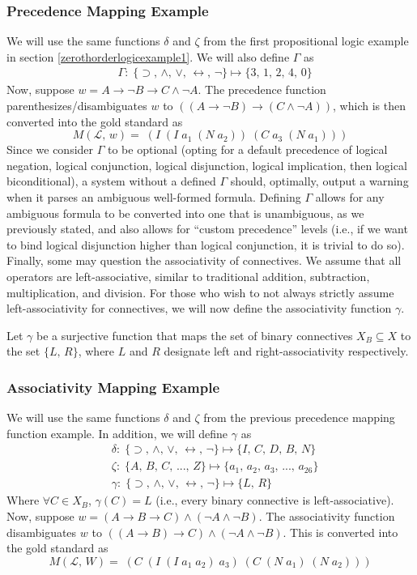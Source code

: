 \documentclass[ms]{uncgdissertationexp2}
\theoremstyle{plain}
\theoremstyle{definition}
\theoremstyle{remark}
\begin{document}
\subsubsection{Precedence Mapping Example} We will use the same functions $\delta$ and $\zeta$ from the first propositional logic example in section \ref{zerothorderlogicexample1}. We will also define $\Gamma$ as
\begin{align*}
	& \Gamma:\;\{\supset,\,\land,\,\lor,\,\leftrightarrow,\,\lnot\}\mapsto\{3,\,1,\,2,\,4,\,0\}                              
\end{align*}
Now, suppose $w = A \to \lnot B \to C \land \lnot A$. The precedence function parenthesizes/disambiguates $w$ to $((A \to \lnot B) \to (C \land \lnot A))$, which is then converted into the gold standard as
\[	
	M(\mathcal{L},\,w) =\;(I\;(I\;a_{1}\;(N\;a_{2}))\;(C\;a_{3}\;(N\;a_{1})))
\]
Since we consider $\Gamma$ to be optional (opting for a default precedence of logical negation, logical conjunction, logical disjunction, logical implication, then logical biconditional), a system without a defined $\Gamma$ should, optimally, output a warning when it parses an ambiguous well-formed formula. Defining $\Gamma$ allows for any ambiguous formula to be converted into one that is unambiguous, as we previously stated, and also allows for ``custom precedence'' levels (i.e., if we want to bind logical disjunction higher than logical conjunction, it is trivial to do so). Finally, some may question the associativity of connectives. We assume that all operators are left-associative, similar to traditional addition, subtraction, multiplication, and division. For those who wish to not always strictly assume left-associativity for connectives, we will now define the associativity function $\gamma$.

Let $\gamma$ be a surjective function that maps the set of binary connectives $X_B \subseteq X$ to the set $\{L,\,R\}$, where $L$ and $R$ designate left and right-associativity respectively.

\subsubsection{Associativity Mapping Example} We will use the same functions $\delta$ and $\zeta$ from the previous precedence mapping function example. In addition, we will define $\gamma$ as 
\begin{align*}
	& \delta:\;\{\supset,\,\land,\,\lor,\,\leftrightarrow,\,\lnot\}\mapsto \{I,\,C,\,D,\,B,\,N\} \\
	& \zeta:\;\{A,\,B,\,C,\,...,\,Z\} \mapsto \{a_{1},\,a_{2},\,a_{3},\,...,\,a_{26}\} \\
	& \gamma:\;\{\supset,\,\land,\,\lor,\,\leftrightarrow,\,\lnot\}\mapsto\{L,\,R\}
\end{align*}
Where $\forall{C}\in{X_B}$, $\gamma{(C)} = L$ (i.e., every binary connective is left-associative). Now, suppose $w = (A \to B \to C) \land (\lnot{A} \land \lnot{B})$. The associativity function disambiguates $w$ to $((A \to B) \to C) \land (\lnot{A} \land \lnot{B})$. This is converted into the gold standard as 
\[
	M(\mathcal{L},\,W) =\;(C\;(I\;(I\;a_1\;a_2)\;a_3)\;(C\;(N\;a_1)\;(N\;a_2)))	
\]
\end{document}
